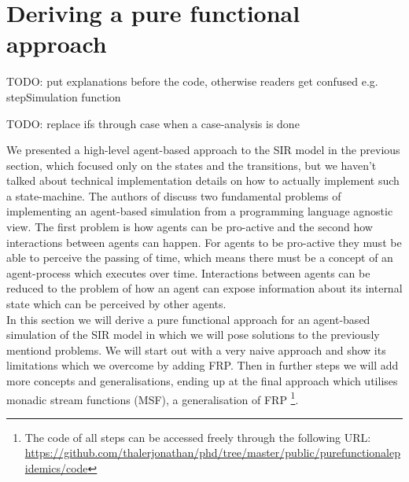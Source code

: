 \section{Deriving a pure functional approach}
\label{sec:functional_approach}


TODO: put explanations before the code, otherwise readers get confused e.g. stepSimulation function

TODO: replace ifs through case when a case-analysis is done

We presented a high-level agent-based approach to the SIR model in the previous section, which focused only on the states and the transitions, but we haven't talked about technical implementation details on how to actually implement such a state-machine. The authors of \cite{thaler_art_2017} discuss two fundamental problems of implementing an agent-based simulation from a programming language agnostic view. The first problem is how agents can be pro-active and the second how interactions between agents can happen. For agents to be pro-active they must be able to perceive the passing of time, which means there must be a concept of an agent-process which executes over time. Interactions between agents can be reduced to the problem of how an agent can expose information about its internal state which can be perceived by other agents. \\
In this section we will derive a pure functional approach for an agent-based simulation of the SIR model in which we will pose solutions to the previously mentiond problems. We will start out with a very naive approach and show its limitations which we overcome by adding FRP. Then in further steps we will add more concepts and generalisations, ending up at the final approach which utilises monadic stream functions (MSF), a generalisation of FRP 
\footnote{The code of all steps can be accessed freely through the following URL: \url{https://github.com/thalerjonathan/phd/tree/master/public/purefunctionalepidemics/code}}.






